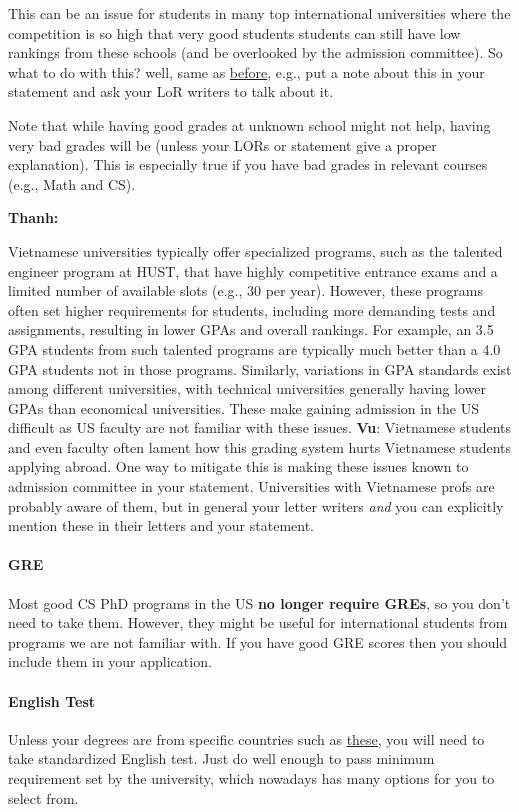 \documentclass[11pt]{article}
\newenvironment{commentbox}[1][]{
\small
    \begin{mybox}
    {\small \textbf{#1}}
 }{
   \end{mybox}
}
\newcommand{\red}[1]{{\color{red}{#1}}}
\begin{document}
This can be an issue for students in many top international universities where the competition is so high that very good students students can still have low rankings from these schools (and be overlooked by the admission committee).
So what to do with this? well, same as \hyperref[sec:your-school]{before}, e.g., put a note about this in your statement and ask your LoR writers to talk about it.

Note that while having good grades at unknown school might not help,
having very bad grades will be \red{red flag} (unless your LORs or
statement give a proper explanation). This is especially true if you
have bad grades in relevant courses (e.g., Math and CS).

\begin{commentbox}[Thanh:]
Vietnamese universities typically offer specialized programs, such as the talented engineer program at HUST, that have highly competitive entrance exams and a limited number of available slots (e.g., 30 per year). However, these programs often set higher requirements for students, including more demanding tests and assignments, resulting in lower GPAs and overall rankings. For example, an 3.5 GPA students from such talented programs are typically much better than a 4.0 GPA students not in those programs.  Similarly, variations in GPA standards exist among different universities, with technical universities generally having lower GPAs than economical universities. These make gaining admission in the US difficult as US faculty are not familiar with these issues.
\tcblower
\textbf{Vu}: Vietnamese students and even faculty often lament how this grading system hurts Vietnamese students applying abroad. One way to mitigate this is making these issues known to admission committee in your statement.  Universities with Vietnamese profs are probably aware of them, but in general your letter writers \emph{and} you can explicitly mention these in their letters and your statement.
\end{commentbox}

\paragraph{GRE} Most good CS PhD programs in the US \textbf{no longer require GREs}, so you don't need to take them. However, they might be useful for international students from programs we are not familiar with.  If you have good GRE scores then you should include them in your application.

\paragraph{English Test} Unless your degrees are from specific countries such as \href{https://github.com/dynaroars/dynaroars.github.io/wiki/About-GMU#standard-tests-waiver-eligible-countries}{these}, you will need to
take standardized English test. Just do well enough to pass minimum requirement set by the university, which nowadays has many options for you to select from.
\end{document}
